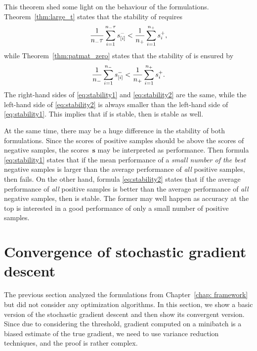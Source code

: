 \noindent This theorem shed some light on the behaviour of the formulations. Theorem~\ref{thm:large_t} states that the stability of \tauFPL requires
\begin{equation}\label{eq:stability1}
  \frac{1}{n_{-}\tau}\sum_{i=1}^{n_{-}\tau}s_{[i]}^- < \frac{1}{n_{+}}\sum_{i=1}^{n_{+}} s_{i}^+,
\end{equation}
while Theorem~\ref{thm:patmat_zero} states that the stability of \PatMatNP is ensured by
\begin{equation}\label{eq:stability2}
  \frac{1}{n_{-}}\sum_{i=1}^{n_{-}}s_{[i]}^- < \frac{1}{n_{+}}\sum_{i=1}^{n_{+}} s_{i}^+.
\end{equation}
The right-hand sides of \eqref{eq:stability1} and \eqref{eq:stability2} are the same, while the left-hand side of \eqref{eq:stability2} is always smaller than the left-hand side of \eqref{eq:stability1}. This implies that if \tauFPL is stable, then \PatMatNP is stable as well.

At the same time, there may be a huge difference in the stability of both formulations. Since the scores of positive samples should be above the scores of negative samples, the scores~$\bm{s}$ may be interpreted as performance. Then formula \eqref{eq:stability1} states that if the mean performance of a \emph{small number of the best} negative samples is larger than the average performance of \emph{all} positive samples, then \tauFPL fails. On the other hand, formula \eqref{eq:stability2} states that if the average performance of \emph{all} positive samples is better than the average performance of \emph{all} negative samples, then \PatMatNP is stable. The former may well happen as accuracy at the top is interested in a good performance of only a small number of positive samples.

\section{Convergence of stochastic gradient descent}\label{sec:convergence}

The previous section analyzed the formulations from Chapter~\ref{chap: framework} but did not consider any optimization algorithms. In this section, we show a basic version of the stochastic gradient descent and then show its convergent version. Since due to considering the threshold, gradient computed on a minibatch is a biased estimate of the true gradient, we need to use variance reduction techniques, and the proof is rather complex.

